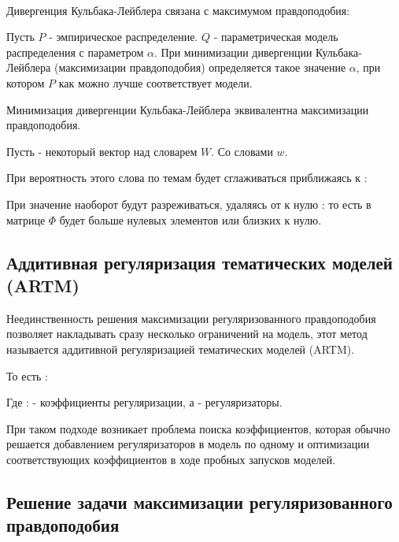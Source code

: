 ~\

Дивергенция Кульбака-Лейблера связана с максимумом правдоподобия:

Пусть $P$ - эмпирическое распределение. $Q$ - параметрическая модель распределения с параметром $\alpha$. При минимизации дивергенции Кульбака-Лейблера (максимизации правдоподобия) определяется такое значение $\alpha$, при котором $P$ как можно лучше соответствует модели.

Минимизация дивергенции Кульбака-Лейблера эквивалентна максимизации правдоподобия. 

Пусть  - некоторый вектор над словарем $W$. Со словами $w$.

При  вероятность  этого слова по темам будет сглаживаться приближаясь к  :  

При  значение  наоборот будут разреживаться, удаляясь от  к нулю :  то есть в матрице $\Phi$ будет больше нулевых элементов или близких к нулю.

\subsection{Аддитивная регуляризация тематических моделей (ARTM)}

Неединственность решения максимизации регуляризованного правдоподобия позволяет накладывать сразу несколько ограничений на модель, этот метод называется аддитивной регуляризацией тематических моделей (ARTM).

То есть :  

Где :  - коэффициенты регуляризации, а  - регуляризаторы.

При таком подходе возникает проблема поиска коэффициентов, которая обычно решается добавлением регуляризаторов в модель по одному и оптимизации соответствующих коэффициентов в ходе пробных запусков моделей.



\subsection{Решение задачи максимизации регуляризованного правдоподобия}

